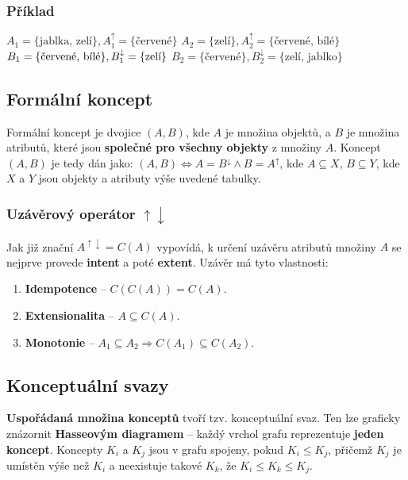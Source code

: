\subsubsection*{Příklad}
$A_1 = \{\textrm{jablka, zelí}\}, A_1^\uparrow = \{\textrm{červené}\}$ \quad $A_2 = \{\textrm{zelí}\}, A_2^\uparrow = \{\textrm{červené, bílé}\}$\\
$B_1 = \{\textrm{\rm červené, bílé}\}, B_1^\downarrow = \{\textrm{zelí}\}$ \quad $B_2 = \{\textrm{červené}\}, B_2^\downarrow = \{\textrm{zelí, jablko}\}$

\subsection{Formální koncept}
Formální koncept je dvojice $(A, B)$, kde $A$ je množina objektů, a $B$ je množina atributů, které jsou \textbf{společné pro všechny objekty} z množiny $A$. Koncept $(A, B)$ je tedy dán jako: $(A, B) \Leftrightarrow A = B^\downarrow \land B = A^\uparrow$, kde $A \subseteq X$, $B \subseteq Y$, kde $X$ a $Y$ jsou objekty a atributy výše uvedené tabulky.

\subsubsection{Uzávěrový operátor $\uparrow \downarrow$}
Jak již znační $A^{\uparrow \downarrow} = C(A)$ vypovídá, k určení uzávěru atributů množiny $A$ se nejprve provede \textbf{intent} a poté \textbf{extent}. Uzávěr má tyto vlastnosti:
\begin{enumerate}
\item \textbf{Idempotence} -- $C(C(A)) = C(A)$.
\item \textbf{Extensionalita} -- $A \subseteq C(A)$.
\item \textbf{Monotonie} -- $A_1 \subseteq A_2 \Rightarrow C(A_1) \subseteq C(A_2)$.
\end{enumerate}

\subsection{Konceptuální svazy}
\textbf{Uspořádaná množina konceptů} tvoří tzv. konceptuální svaz. Ten lze graficky znázornit \textbf{Hasseovým diagramem} -- každý vrchol grafu reprezentuje \textbf{jeden koncept}. Koncepty $ K_i $ a $ K_j $ jsou v grafu spojeny, pokud $ K_i \leq K_j$, přičemž $K_j$ je umístěn výše než $K_i$ a neexistuje takové $K_k$, že $ K_i \leq K_k \leq K_j$.


